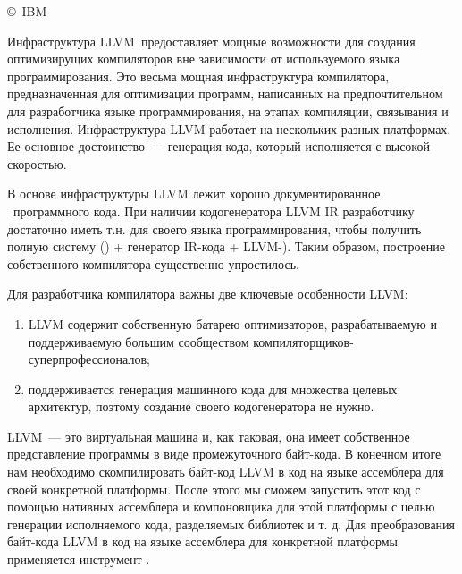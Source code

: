 \secdown


\copyright\ IBM


\bigskip
Инфраструктура LLVM\ предоставляет мощные возможности для создания оптимизирущих
компиляторов вне зависимости от используемого языка программирования.
Это весьма мощная инфраструктура компилятора, предназначенная для оптимизации
программ, написанных на предпочтительном для разработчика языке
программирования, на этапах компиляции, связывания и исполнения. Инфраструктура
LLVM работает на нескольких разных платформах. Ее основное достоинство\ ---
генерация кода, который исполняется с высокой скоростью.

В основе инфраструктуры LLVM лежит хорошо документированное
\ программного кода.
При наличии кодогенератора LLVM IR разработчику достаточно иметь т.н.
 для своего языка программирования,
чтобы получить полную систему  () + генератор
IR-кода + LLVM-). Таким образом, построение
собственного компилятора существенно упростилось.

Для разработчика компилятора важны две ключевые особенности LLVM:

\begin{enumerate}
  \item LLVM содержит собственную батарею оптимизаторов, разрабатываемую и
  поддерживаемую большим сообществом компиляторщиков-суперпрофессионалов;
  \item поддерживается генерация машинного кода для множества целевых
  архитектур, поэтому создание своего кодогенератора не нужно.
\end{enumerate}


LLVM\ --- это виртуальная машина и, как таковая, она имеет собственное
представление программы в виде промежуточного байт-кода. В конечном итоге нам
необходимо скомпилировать байт-код LLVM в код на языке ассемблера для своей
конкретной платформы. После этого мы сможем запустить этот код с помощью
нативных ассемблера и компоновщика для этой платформы с целью генерации
исполняемого кода, разделяемых библиотек и т. д. Для преобразования байт-кода
LLVM в код на языке ассемблера для конкретной платформы применяется инструмент
.

